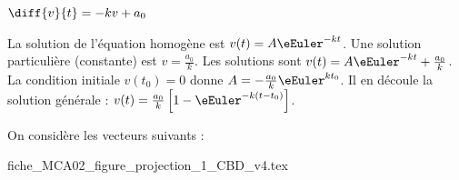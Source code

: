 \begin{enonce}
	$\diff{v}{t} =  -kv+a_0$
\end{enonce}


\begin{corrige}
La solution de l'équation homogène est $v(t) = A\eEuler^{-kt}$. Une solution particulière (constante) est $v = \frac{a_0}{k}$. Les solutions sont  $v(t) = A\eEuler^{-kt}+\frac{a_0}{k}$. La condition initiale $v(t_0)=0$ donne $A=-\frac{a_0}{k}\eEuler^{kt_0}$. Il en découle la solution générale : $v(t) = \frac{a_0}{k}\left[1-\eEuler^{-k(t-t_0)}\right]$.
\end{corrige}

\finEntrainement










\newpage







\hauteurLargeurCadreReponse		{9mm}{5cm}
\initialisationEntrainement

On considère les vecteurs suivants : 
\begin{center}
{fiche_MCA02_figure_projection_1_CBD_v4.tex}
\end{center}

